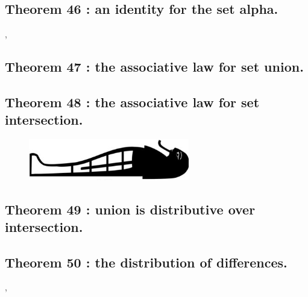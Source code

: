 \documentclass[preview]{standalone}
\begin{document}
\subsection[An identity for the set alpha.]
    {
        \color{section}Theorem 46 \color{black} : an identity for the set alpha.
    }

\sep


\subsection[The associative law for set union.]
    {
        \color{section}Theorem 47 \color{black} : the associative law for set union.
    }

\pagebreak


\subsection[The associative law for set intersection.]
    {
        \color{section}Theorem 48 \color{black} : the associative law for set intersection.
    }

\vspace{2.5\baselineskip}
\begin{figure}[!h]
    \centering
    \includegraphics[width=7cm]{../resources/jpg/2.2.set.operations/border7.jpg}
\end{figure}
\vspace{2\baselineskip}


\subsection[Union is distributive over intersection.]
    {
        \color{section}Theorem 49 \color{black} : union is distributive over intersection.
    }

\pagebreak


\subsection[The distribution of differences.]
    {
        \color{section}Theorem 50 \color{black} : the distribution of differences.
    }

\sep
\pagebreak
\end{document}
